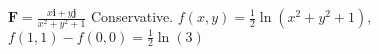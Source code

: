 {$\mathbf{F} = \frac{x \mathbf{i} + y \mathbf{j}}{x^2+y^2+1}$
}
{Conservative.  $f(x,y) = \frac{1}{2} \ln{\left (x^{2} + y^{2} + 1 \right )}$, $f(1,1) - f(0,0) = \frac{1}{2} \ln{\left (3 \right )} $}
